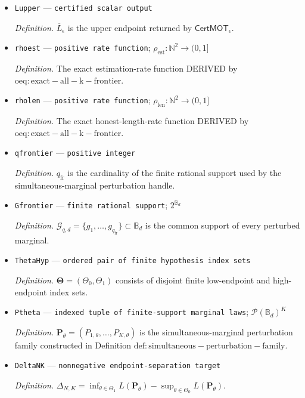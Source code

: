 \documentclass{article}
\begin{document}
\begin{itemize}
  \item \texttt{Lupper} --- \texttt{certified scalar output}
  \par\smallskip\noindent\emph{Definition.} \(\overline L_\epsilon\) is the upper endpoint returned by \(\mathsf{CertMOT}_\epsilon\).
  \item \texttt{rhoest} --- \texttt{positive rate function}; \(\rho_{\mathrm{est}}:\mathbb N^2\to(0,1]\)
  \par\smallskip\noindent\emph{Definition.} The exact estimation-rate function DERIVED by \(\mathrm{oeq:exact-all-k-frontier}\).
  \item \texttt{rholen} --- \texttt{positive rate function}; \(\rho_{\mathrm{len}}:\mathbb N^2\to(0,1]\)
  \par\smallskip\noindent\emph{Definition.} The exact honest-length-rate function DERIVED by \(\mathrm{oeq:exact-all-k-frontier}\).
  \item \texttt{qfrontier} --- \texttt{positive integer}
  \par\smallskip\noindent\emph{Definition.} \(q_{\mathrm{fr}}\) is the cardinality of the finite rational support used by the simultaneous-marginal perturbation handle.
  \item \texttt{Gfrontier} --- \texttt{finite rational support}; \(2^{\mathbb B_d}\)
  \par\smallskip\noindent\emph{Definition.} \(\mathcal G_{q,d}=\{g_1,\ldots,g_{q_{\mathrm{fr}}}\}\subset\mathbb B_d\) is the common support of every perturbed marginal.
  \item \texttt{ThetaHyp} --- \texttt{ordered pair of finite hypothesis index sets}
  \par\smallskip\noindent\emph{Definition.} \(\boldsymbol\Theta=(\Theta_0,\Theta_1)\) consists of disjoint finite low-endpoint and high-endpoint index sets.
  \item \texttt{Ptheta} --- \texttt{indexed tuple of finite-\allowbreak{}support marginal laws}; \(\mathcal P(\mathbb B_d)^K\)
  \par\smallskip\noindent\emph{Definition.} \(\mathbf P_\theta=(P_{1,\theta},\ldots,P_{K,\theta})\) is the simultaneous-marginal perturbation family constructed in Definition \(\mathrm{def:simultaneous-perturbation-family}\).
  \item \texttt{DeltaNK} --- \texttt{nonnegative endpoint-\allowbreak{}separation target}
  \par\smallskip\noindent\emph{Definition.} \(\Delta_{N,K}=\inf_{\theta\in\Theta_1}L(\mathbf P_\theta)-\sup_{\theta\in\Theta_0}L(\mathbf P_\theta)\).

\end{itemize}
\end{document}
